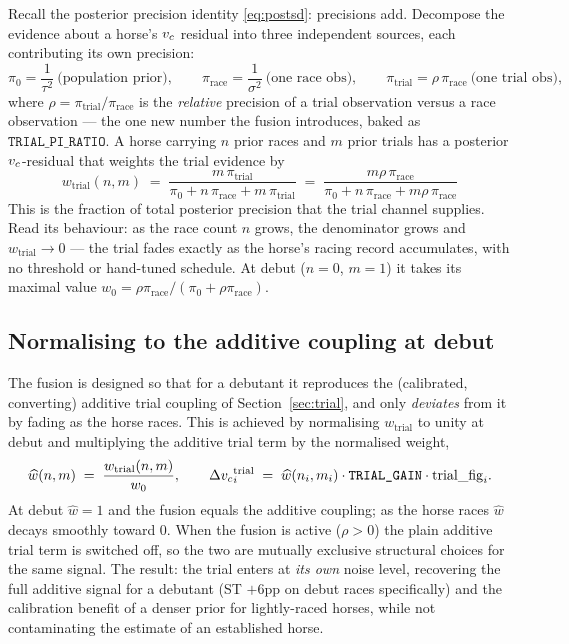 Recall the posterior precision identity \eqref{eq:postsd}: precisions add. Decompose the evidence
about a horse's ${v_{c}}$ residual into three independent sources, each contributing its own
precision:
\begin{equation}
  \pi_0 = \frac{1}{\tau^2}\ \text{(population prior)},\qquad
  \pi_{\text{race}} = \frac{1}{\sigma^2}\ \text{(one race obs)},\qquad
  \pi_{\text{trial}} = \rho\,\pi_{\text{race}}\ \text{(one trial obs)} ,
  \label{eq:precisions}
\end{equation}
where $\rho = \pi_{\text{trial}}/\pi_{\text{race}}$ is the \emph{relative} precision of a trial
observation versus a race observation --- the one new number the fusion introduces, baked as
$\texttt{TRIAL\_PI\_RATIO}$. A horse carrying $n$ prior races and $m$ prior trials has a posterior
${v_{c}}$-residual that weights the trial evidence by
\begin{equation}
  \boxed{\;
  w_{\text{trial}}(n,m)
   \;=\; \frac{m\,\pi_{\text{trial}}}{\pi_0 + n\,\pi_{\text{race}} + m\,\pi_{\text{trial}}}
   \;=\; \frac{m\rho\,\pi_{\text{race}}}{\pi_0 + n\,\pi_{\text{race}} + m\rho\,\pi_{\text{race}}}\; }
  \label{eq:wtrial}
\end{equation}
This is the fraction of total posterior precision that the trial channel supplies. Read its
behaviour: as the race count $n$ grows, the denominator grows and $w_{\text{trial}}\to 0$ --- the
trial fades exactly as the horse's racing record accumulates, with no threshold or hand-tuned
schedule. At debut ($n=0$, $m=1$) it takes its maximal value
$w_0 = \rho\pi_{\text{race}}/(\pi_0+\rho\pi_{\text{race}})$.

\subsection{Normalising to the additive coupling at debut}

The fusion is designed so that for a debutant it reproduces the (calibrated, converting) additive
trial coupling of Section~\ref{sec:trial}, and only \emph{deviates} from it by fading as the horse
races. This is achieved by normalising $w_{\text{trial}}$ to unity at debut and multiplying the
additive trial term by the normalised weight,
\begin{equation}
  \widehat w(n,m) \;=\; \frac{w_{\text{trial}}(n,m)}{w_0},
  \qquad
  \Delta{v_{c}}^{\text{trial}}_i \;=\; \widehat w(n_i,m_i)\cdot \texttt{TRIAL\_GAIN}\cdot \mathrm{trial\_fig}_i .
  \label{eq:trialterm}
\end{equation}
At debut $\widehat w = 1$ and the fusion equals the additive coupling; as the horse races
$\widehat w$ decays smoothly toward $0$. When the fusion is active ($\rho>0$) the plain additive
trial term is switched off, so the two are mutually exclusive structural choices for the same
signal. The result: the trial enters at \emph{its own} noise level, recovering the full additive
signal for a debutant (ST $+6$pp on debut races specifically) and the calibration benefit of a
denser prior for lightly-raced horses, while not contaminating the estimate of an established
horse.

